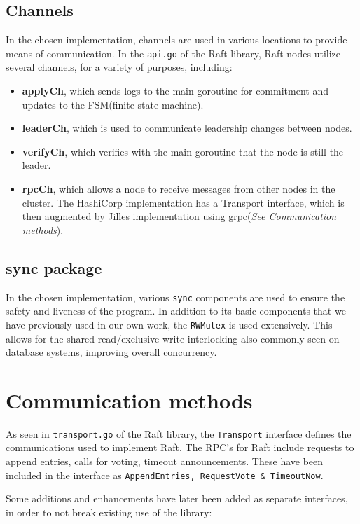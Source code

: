 \documentclass[a4paper,11pt]{article}
\begin{document}
\subsection{Channels}
In the chosen implementation, channels are used in various locations to provide means of communication. In the \texttt{api.go} of the Raft library, Raft nodes utilize several channels, for a variety of purposes, including:
\begin{itemize}
    \item \textbf{applyCh}, which sends logs to the main goroutine for commitment and updates to the FSM(finite state machine).
    \item \textbf{leaderCh}, which is used to communicate leadership changes between nodes.
    \item \textbf{verifyCh}, which verifies with the main goroutine that the node is still the leader.
    \item \textbf{rpcCh}, which allows a node to receive messages from other nodes in the cluster. The HashiCorp implementation has a Transport interface, which is then augmented by Jilles implementation using grpc(\textit{See Communication methods}).
\end{itemize}
\subsection{sync package} %
In the chosen implementation, various \texttt{sync} components are used to ensure the safety and liveness of the program. In addition to its basic components that we have previously used in our own work, the \texttt{RWMutex} is used extensively. This allows for the shared-read/exclusive-write interlocking also commonly seen on database systems, improving overall concurrency. 
\section{Communication methods}

As seen in \texttt{transport.go} of the Raft library, the \texttt{Transport} interface defines the communications used to implement Raft. The RPC's for Raft include requests to append entries, calls for voting, timeout announcements. These have been included in the interface as \texttt{AppendEntries, RequestVote \& TimeoutNow}. 


\bigbreak
\noindent Some additions and enhancements have later been added as separate interfaces, in order to not break existing use of the library:
\end{document}
